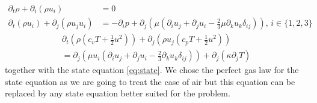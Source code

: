 \begin{subappendices}
	\begin{align}
		\partial_t\rho + \partial_i(\rho u_i) &= 0 \\
		\partial_t(\rho u_i) + \partial_j (\rho u_ju_i) &= -\partial_i p + \partial_j\left(\mu\left(\partial_iu_j + \partial_ju_i - \frac{2}{3}\mu\partial_ku_k\delta_{ij}\right)\right) , \, i\in\{1, 2, 3\}	
	\end{align}
	\vspace{-0.7cm}
	\begin{multline}
		\partial_t\left(\rho \left(c_vT + \frac{1}{2}u^2\right)\right) + \partial_j \left(\rho u_j \left(c_pT + \frac{1}{2}u^2\right)\right) \\ = \partial_j\left(\mu u_i\left(\partial_iu_j + \partial_ju_i - \frac{2}{3}\partial_ku_k\delta_{ij}\right)\right) + \partial_j (\kappa\partial_jT)
	\end{multline}
	together with the state equation \ref{eq:state}. We chose the perfect gas law for the state equation as we are going to treat the case of air but this equation can be replaced by any state equation better suited for the problem.
	

\end{subappendices}
